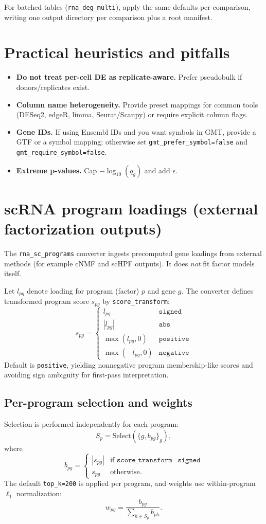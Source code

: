 \documentclass[11pt]{article}
\begin{document}
For batched tables (\texttt{rna\_deg\_multi}), apply the same defaults per comparison, writing one output directory per comparison plus a root manifest.

\section{Practical heuristics and pitfalls}
\begin{itemize}[leftmargin=2em]
\item \textbf{Do not treat per-cell DE as replicate-aware.} Prefer pseudobulk if donors/replicates exist. \cite{crowell2020muscat}
\item \textbf{Column name heterogeneity.} Provide preset mappings for common tools (DESeq2, edgeR, limma, Seurat/Scanpy) or require explicit column flags.
\item \textbf{Gene IDs.} If using Ensembl IDs and you want symbols in GMT, provide a GTF or a symbol mapping; otherwise set \texttt{gmt\_prefer\_symbol=false} and \texttt{gmt\_require\_symbol=false}.
\item \textbf{Extreme p-values.} Cap $-\log_{10}(q_g)$ and add $\epsilon$.
\end{itemize}

\section{scRNA program loadings (external factorization outputs)}
The \texttt{rna\_sc\_programs} converter ingests precomputed gene loadings from external methods (for example cNMF and scHPF outputs). It does \emph{not} fit factor models itself.

Let $l_{pg}$ denote loading for program (factor) $p$ and gene $g$. The converter defines transformed program score $s_{pg}$ by \texttt{score\_transform}:
\[
s_{pg} =
\begin{cases}
l_{pg} & \texttt{signed}\\
|l_{pg}| & \texttt{abs}\\
\max(l_{pg}, 0) & \texttt{positive}\\
\max(-l_{pg}, 0) & \texttt{negative}
\end{cases}
\]
Default is \texttt{positive}, yielding nonnegative program membership-like scores and avoiding sign ambiguity for first-pass interpretation.

\subsection*{Per-program selection and weights}
Selection is performed independently for each program:
\[
S_p = \mathrm{Select}\left(\{g, b_{pg}\}_g\right),
\]
where
\[
b_{pg} =
\begin{cases}
|s_{pg}| & \text{if } \texttt{score\_transform=signed}\\
s_{pg} & \text{otherwise}.
\end{cases}
\]
The default \texttt{top\_k=200} is applied per program, and weights use within-program $\ell_1$ normalization:
\[
w_{pg} = \frac{b_{pg}}{\sum_{h \in S_p} b_{ph}}.
\]
\end{document}
